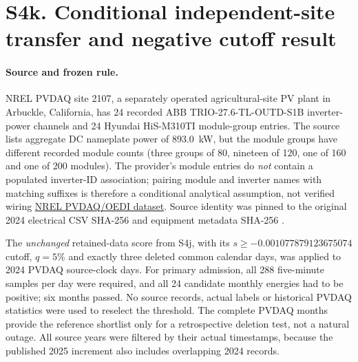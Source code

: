 \documentclass[11pt]{article}
\begin{document}
\section*{S4k. Conditional independent-site transfer and negative cutoff result}
\paragraph{Source and frozen rule.} NREL PVDAQ site 2107, a separately operated agricultural-site PV plant in Arbuckle, California, has 24 recorded ABB TRIO-27.6-TL-OUTD-S1B inverter-power channels and 24 Hyundai HiS-M310TI module-group entries. The source lists aggregate DC nameplate power of 893.0~kW, but the module groups have different recorded module counts (three groups of 80, nineteen of 120, one of 160 and one of 200 modules). The provider's module entries do \emph{not} contain a populated inverter-ID association; pairing module and inverter names with matching suffixes is therefore a conditional analytical assumption, not verified wiring \href{https://doi.org/10.25984/1846021}{NREL PVDAQ/OEDI dataset}. Source identity was pinned to the original 2024 electrical CSV SHA-256 \texttt{} and equipment metadata SHA-256 \texttt{}.

The \emph{unchanged} retained-data score from S4j, with its $s\geq -0.001077879123675074$ cutoff, $q=5\%$ and exactly three deleted common calendar days, was applied to 2024 PVDAQ source-clock days. For primary admission, all 288 five-minute samples per day were required, and all 24 candidate monthly energies had to be positive; six months passed. No source records, actual labels or historical PVDAQ statistics were used to reselect the threshold. The complete PVDAQ months provide the reference shortlist only for a retrospective deletion test, not a natural outage. All source years were filtered by their actual timestamps, because the published 2025 increment also includes overlapping 2024 records.
\end{document}
